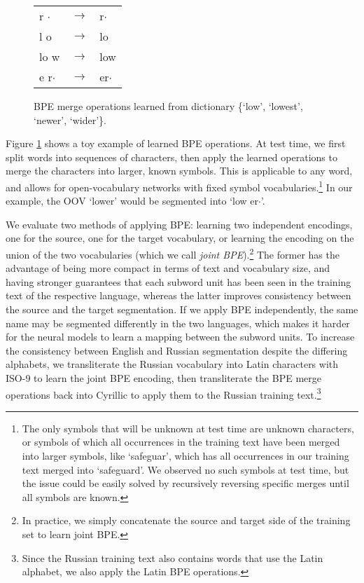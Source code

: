 \documentclass[11pt]{article}
\begin{document}
\begin{figure}
\centering
\small{
\begin{tabular}{lcl}
r $\cdot$ & $\rightarrow$ & r$\cdot$ \\
l o & $\rightarrow$ & lo\\
lo w & $\rightarrow$ & low\\
e r$\cdot$ & $\rightarrow$ & er$\cdot$ \\
\end{tabular}}
\caption{BPE merge operations learned from dictionary \{`low', `lowest', `newer', `wider'\}.}
\label{bpe-example}
\end{figure}

Figure \ref{bpe-example} shows a toy example of learned BPE operations.
At test time, we first split words into sequences of characters, then apply the learned operations to merge the characters into larger, known symbols.
This is applicable to any word, and allows for open-vocabulary networks with fixed symbol vocabularies.\footnote{The only symbols that will be unknown at test time are unknown characters, or symbols of which all occurrences in the training text have been merged into larger symbols, like `safeguar', which has all occurrences in our training text merged into `safeguard'. We observed no such symbols at test time, but the issue could be easily solved by recursively reversing specific merges until all symbols are known.}
In our example, the OOV `lower' would be segmented into `low er$\cdot$'.

We evaluate two methods of applying BPE:
learning two independent encodings, one for the source, one for the target vocabulary, or learning the encoding on the union of the two vocabularies (which we call \emph{joint BPE}).\footnote{In practice, we simply concatenate the source and target side of the training set to learn joint BPE.}
The former has the advantage of being more compact in terms of text and vocabulary size, and having stronger guarantees that each subword unit has been seen in the training text of the respective language,
whereas the latter improves consistency between the source and the target segmentation.
If we apply BPE independently, the same name may be segmented differently in the two languages, which makes it harder for the neural models to learn a mapping between the subword units.
To increase the consistency between English and Russian segmentation despite the differing alphabets, we transliterate the Russian vocabulary into Latin characters with ISO-9 to learn the joint BPE encoding,
then transliterate the BPE merge operations back into Cyrillic to apply them to the Russian training text.\footnote{Since the Russian training text also contains words that use the Latin alphabet, we also apply the Latin BPE operations.}
\end{document}
